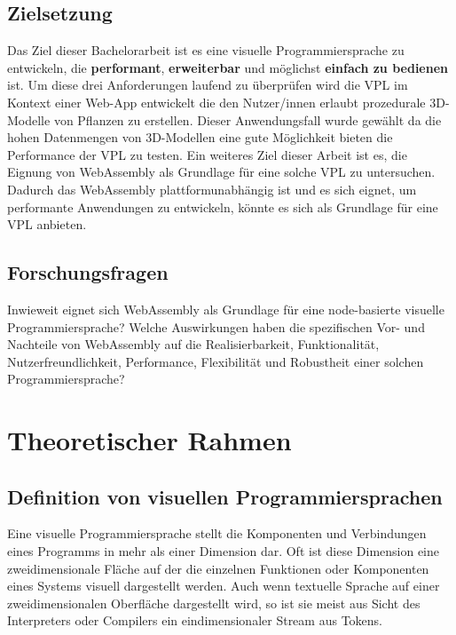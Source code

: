 \documentclass[ngerman]{article}
\begin{document}
\subsection{Zielsetzung} 
\label{sec:Zielsetzung}

Das Ziel dieser Bachelorarbeit ist es eine visuelle Programmiersprache zu entwickeln, die \textbf{performant}, \textbf{erweiterbar} und möglichst \textbf{einfach zu bedienen} ist.
Um diese drei Anforderungen laufend zu überprüfen wird die VPL im Kontext einer Web-App entwickelt die den Nutzer/innen erlaubt prozedurale 3D-Modelle von Pflanzen zu erstellen.
Dieser Anwendungsfall wurde gewählt da die hohen Datenmengen von 3D-Modellen eine gute Möglichkeit bieten die Performance der VPL zu testen.
\br
Ein weiteres Ziel dieser Arbeit ist es, die Eignung von WebAssembly als Grundlage für eine solche VPL zu untersuchen. 
Dadurch das WebAssembly plattformunabhängig ist und es sich eignet, um performante Anwendungen zu entwickeln, könnte es sich als Grundlage für eine VPL anbieten.

\subsection{Forschungsfragen}

Inwieweit eignet sich WebAssembly als Grundlage für eine node-basierte visuelle Programmiersprache?  
\br
Welche Auswirkungen haben die spezifischen Vor- und Nachteile von WebAssembly auf die Realisierbarkeit, Funktionalität, Nutzerfreundlichkeit, Performance, Flexibilität und Robustheit einer solchen Programmiersprache?

\section{Theoretischer Rahmen}

\subsection{Definition von visuellen Programmiersprachen}
Eine visuelle Programmiersprache stellt die Komponenten und Verbindungen eines Programms in mehr als einer Dimension dar. Oft ist diese Dimension eine zweidimensionale Fläche auf der die einzelnen Funktionen oder Komponenten eines Systems visuell dargestellt werden. \cite{Myers}
Auch wenn textuelle Sprache auf einer zweidimensionalen Oberfläche dargestellt wird, so ist sie meist aus Sicht des Interpreters oder Compilers ein eindimensionaler Stream aus Tokens.
\end{document}
